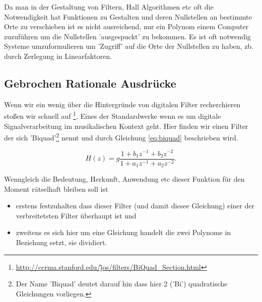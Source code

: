 Da man in der Gestaltung von Filtern, Hall Algorithmen etc oft die Notwendigkeit hat Funktionen zu Gestalten und deren Nullstellen an bestimmte Orte zu verschieben ist es nicht ausreichend, nur ein Polynom einem Computer zuzuführen um die Nullstellen 'ausgespuckt' zu bekommen. Es ist oft notwendig Systeme umzuformulieren um 'Zugriff' auf die Orte der Nullstellen zu haben, zb. durch Zerlegung in Linearfaktoren. 


\subsection{Gebrochen Rationale Ausdrücke}\label{subsec:rationalExp}
Wenn wir ein wenig über die Hintergründe von digitalen Filter recherchieren stoßen wir schnell auf 
\cite{FILTERSWEB07}\footnote{\href{http://ccrma.stanford.edu/\~jos/filters/BiQuad\_Section.html}{http://ccrma.stanford.edu/\~jos/filters/BiQuad\_Section.html}}. Eines der Standardwerke wenn es um digitale Signalverarbeitung im musikalischen Kontext geht. Hier finden wir einen Filter der sich 'Biquad'\footnote{Der Name 'Biquad' deutet darauf hin dass hier 2 ('Bi') quadratische Gleichungen vorliegen.} nennt und durch Gleichung \ref{eq:biquad} beschrieben wird.

% 

\begin{equation}
H(z) = g\frac{1 + b_1 z^{-1}+ b_2 z^{-2}}{1 + a_1 z^{-1}+ a_2 z^{-2}}. \label{eq:biquad}
\end{equation}

Wenngleich die Bedeutung, Herkunft, Anwendung etc dieser Funktion für den Moment rätselhaft bleiben soll ist 
\begin{itemize}
\item erstens festzuhalten dass dieser Filter (und damit diesee Gleichung) einer der verbreitetsten Filter überhaupt ist und 
\item zweitens es sich hier um eine Gleichung handelt die zwei Polynome in Beziehung setzt, sie dividiert. \\
\end{itemize}



